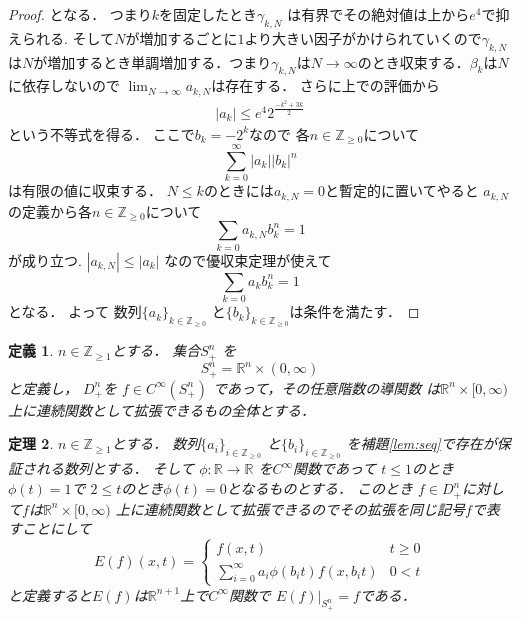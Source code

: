 \documentclass[leqno, a4paper, 12pt]{jsarticle}
\newtheorem{thm}{定理}
\newtheorem{df}[thm]{定義}
\newcommand{\zz}{\mathbb{Z}}
\newcommand{\rr}{\mathbb{R}}
\begin{document}
\begin{proof}
となる．
つまり$k$を固定したとき$\gamma_{k, N}$
は有界でその絶対値は上から$e^{4}$で抑えられる.
そして$N$が増加するごとに$1$より大きい因子がかけられていくので$\gamma_{k, N}$は$N$が増加するとき単調増加する．つまり$\gamma_{k, N}$は$N\to \infty$のとき収束する．$\beta_{k}$は$N$に依存しないので
$\lim_{N\to \infty}a_{k, N}$は存在する．
さらに上での評価から
\begin{align}
|a_{k}|\le e^{4}2^{\frac{-k^{2}+3k}{2}}
\end{align}
という不等式を得る．
ここで$b_{k}=-2^{k}$なので
各$n\in \zz_{\ge 0}$について
\[
\sum_{k=0}^{\infty}|a_{k}||b_{k}|^{n}
\]
は有限の値に収束する．
$N\le k$のときには$a_{k, N}=0$と暫定的に置いてやると
$a_{k, N}$の定義から各$n\in \zz_{\ge 0}$について
\[
\sum_{k=0}a_{k, N}b_{k}^{n}=1
\]
が成り立つ.
$|a_{k, N}|\le |a_{k}|$
なので優収束定理が使えて
\[
\sum_{k=0}a_{k}b_{k}^{n}=1
\]
となる．
よって
数列$\{a_{k}\}_{k\in \zz_{\ge 0}}$
と$\{b_{k}\}_{k\in\zz_{\ge 0}}$は条件を満たす．
\end{proof}
\begin{df}
$n\in \zz_{\ge 1}$とする．
集合$S_{+}^{n}$
を
\[
S_{+}^{n}=\rr^{n}\times (0, \infty)
\]
と定義し，
$D_{+}^{n}$を
$f\in C^{\infty}(S_{+}^{n})$
であって，その任意階数の導関数
は$\rr^{n}\times [0, \infty)$
上に連続関数として拡張できるもの全体とする．
\end{df}
\begin{thm}
$n\in \zz_{\ge 1}$とする．
数列$\{a_{i}\}_{i\in \zz_{\ge 0}}$
と$\{b_{i}\}_{i\in \zz_{\ge 0}}$
を補題\ref{lem:seq}で存在が保証される数列とする．
そして
$\phi: \rr\to \rr$
を$C^{\infty}$関数であって
$t\le 1$のとき$\phi(t)=1$で
$2\le t$のとき$\phi(t)=0$となるものとする．
このとき
$f\in D_{+}^{n}$に対して$f$は$\rr^{n}\times [0, \infty)$
上に連続関数として拡張できるのでその拡張を同じ記号$f$で表すことにして
\[
E(f)(x, t)=
\begin{cases}
f(x, t) & \text{$t\ge 0$}\\
\displaystyle \sum_{i=0}^{\infty}a_{i}\phi(b_{i}t)f(x, b_{i}t)
& \text{$0<t$}
\end{cases}
\]
と定義すると$E(f)$は$\rr^{n+1}$上で$C^{\infty}$関数で
$E(f)|_{S_{+}^{n}}=f$である．
\end{thm}
\end{document}
